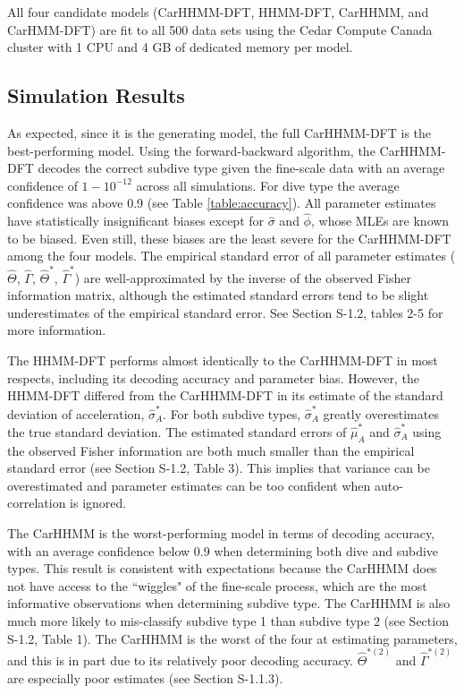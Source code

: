 All four candidate models (CarHHMM-DFT, HHMM-DFT, CarHHMM, and CarHMM-DFT) are fit to all 500 data sets using the Cedar Compute Canada cluster with 1 CPU and 4 GB of dedicated memory per model.

\subsection{Simulation Results}

As expected, since it is the generating model, the full CarHHMM-DFT is the best-performing model. Using the forward-backward algorithm, the CarHHMM-DFT decodes the correct subdive type given the fine-scale data with an average confidence of $1 - 10^{-12}$ across all simulations. For dive type the average confidence was above 0.9 (see Table \ref{table:accuracy}). All parameter estimates have statistically insignificant biases except for $\hat \sigma$ and $\hat \phi$, whose MLEs are known to be biased. Even still, these biases are the least severe for the CarHHMM-DFT among the four models. The empirical standard error of all parameter estimates ($\hat \Theta$, $\hat \Gamma$, $\hat \Theta^*$, $\hat \Gamma^*$) are well-approximated by the inverse of the observed Fisher information matrix, although the estimated standard errors tend to be slight underestimates of the empirical standard error. See Section S-1.2, tables 2-5 for more information.

The HHMM-DFT performs almost identically to the CarHHMM-DFT in most respects, including its decoding accuracy and parameter bias. However, the HHMM-DFT differed from the CarHHMM-DFT in its estimate of the standard deviation of acceleration, $\hat \sigma_A^*$. For both subdive types, $\hat \sigma_A^*$ greatly overestimates the true standard deviation. The estimated standard errors of $\hat \mu_A^*$ and $\hat \sigma_A^*$ using the observed Fisher information are both much smaller than the empirical standard error (see Section S-1.2, Table 3). This implies that variance can be overestimated and parameter estimates can be too confident when auto-correlation is ignored.

The CarHHMM is the worst-performing model in terms of decoding accuracy, with an average confidence below $0.9$ when determining both dive and subdive types. This result is consistent with expectations because the CarHHMM does not have access to the ``wiggles" of the fine-scale process, which are the most informative observations when determining subdive type. The CarHHMM is also much more likely to mis-classify subdive type 1 than subdive type 2 (see Section S-1.2, Table 1). The CarHHMM is the worst of the four at estimating parameters, and this is in part due to its relatively poor decoding accuracy. $\hat \Theta^{*(2)}$ and $\hat \Gamma^{*(2)}$ are especially poor estimates (see Section S-1.1.3).

